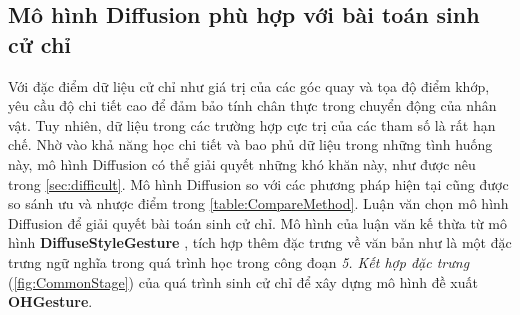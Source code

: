 \subsection{Mô hình Diffusion phù hợp với bài toán sinh cử chỉ}
\label{subsec:reason}

Với đặc điểm dữ liệu cử chỉ như giá trị của các góc quay và tọa độ điểm khớp, yêu cầu độ chi tiết cao để đảm bảo tính chân thực trong chuyển động của nhân vật. Tuy nhiên, dữ liệu trong các trường hợp cực trị của các tham số là rất hạn chế. Nhờ vào khả năng học chi tiết và bao phủ dữ liệu trong những tình huống này, mô hình Diffusion có thể giải quyết những khó khăn này, như được nêu trong \autoref{sec:difficult}. Mô hình Diffusion so với các phương pháp hiện tại cũng được so sánh ưu và nhược điểm trong \autoref{table:CompareMethod}. Luận văn chọn mô hình Diffusion để giải quyết bài toán sinh cử chỉ. Mô hình của luận văn kế thừa từ mô hình \textbf{DiffuseStyleGesture} \cite{yang2023diffusestylegesture}, tích hợp thêm đặc trưng về văn bản như là một đặc trưng ngữ nghĩa trong quá trình học trong công đoạn \textit{5. Kết hợp đặc trưng} (\autoref{fig:CommonStage}) của quá trình sinh cử chỉ để xây dựng mô hình đề xuất \textbf{OHGesture}.


